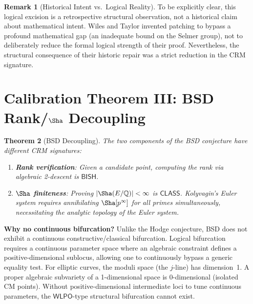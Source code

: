 \documentclass[11pt,a4paper]{article}
\theoremstyle{plain}
\newtheorem{theorem}{Theorem}[section]
\theoremstyle{definition}
\newtheorem{remark}[theorem]{Remark}
\newcommand{\BISH}{\textsf{BISH}}
\newcommand{\WLPO}{\textsf{WLPO}}
\newcommand{\CLASS}{\textsf{CLASS}}
\newcommand{\Q}{\mathbb{Q}}
\begin{document}
\begin{remark}[Historical Intent vs.\ Logical Reality]\label{rem:wiles-intent}
To be explicitly clear, this logical excision is a retrospective structural observation, not a historical claim about mathematical intent. Wiles and Taylor invented patching to bypass a profound mathematical gap (an inadequate bound on the Selmer group), not to deliberately reduce the formal logical strength of their proof. Nevertheless, the structural consequence of their historic repair was a strict reduction in the CRM signature.
\end{remark}


\section{Calibration Theorem III: BSD Rank/$\Sha$ Decoupling}\label{sec:bsd}

\begin{theorem}[BSD Decoupling]\label{thm:bsd-decouple}
The two components of the BSD conjecture have different CRM signatures:
\begin{enumerate}[label=(\roman*)]
\item \textbf{Rank verification}: Given a candidate point, computing the rank via algebraic 2-descent is $\BISH$.
\item \textbf{$\Sha$ finiteness}: Proving $|\Sha(E/\Q)| < \infty$ is $\CLASS$. Kolyvagin's Euler system requires annihilating $\Sha[p^\infty]$ for all primes simultaneously, necessitating the analytic topology of the Euler system.
\end{enumerate}
\end{theorem}

\textbf{Why no continuous bifurcation?} Unlike the Hodge conjecture, BSD does not exhibit a continuous constructive/classical bifurcation. Logical bifurcation requires a continuous parameter space where an algebraic constraint defines a positive-dimensional sublocus, allowing one to continuously bypass a generic equality test. For elliptic curves, the moduli space (the $j$-line) has dimension~1. A proper algebraic subvariety of a 1-dimensional space is 0-dimensional (isolated CM points). Without positive-dimensional intermediate loci to tune continuous parameters, the $\WLPO$-type structural bifurcation cannot exist.


\end{document}
